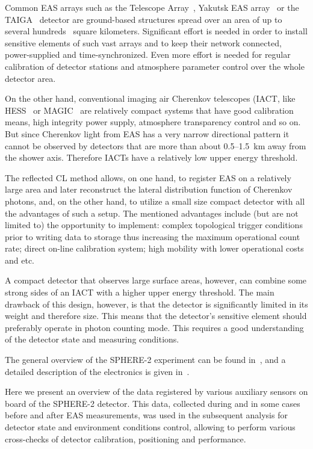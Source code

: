 \documentclass[final,5p,times,twocolumn]{elsarticle}
\begin{document}
Common EAS arrays such as the Telescope Array~\cite{abu12}, Yakutsk EAS array~\cite{Yakutsk19} or the TAIGA~\cite{TAIGA20} detector are ground-based structures spread over an area of up to several hundreds~\cite{abu12} square kilometers. Significant effort is needed in order to install sensitive elements of such vast arrays and to keep their network connected, power-supplied and time-synchronized. Even more effort is needed for regular calibration of detector stations and atmosphere parameter control over the whole detector area. 

On the other hand, conventional imaging air Cherenkov telescopes (IACT, like HESS~\cite{HESS03a, HESS03b} or MAGIC~\cite{MAGIC16-1, MAGIC16-2} are relatively compact systems that have good calibration means, high integrity power supply, atmosphere transparency control and so on. But since Cherenkov light from EAS has a very narrow directional pattern it cannot be observed by detectors that are more than about 0.5--1.5~km away from the shower axis. Therefore IACTs have a relatively low upper energy threshold.

The reflected CL method allows, on one hand, to register EAS on a relatively large area and later reconstruct the lateral distribution function of Cherenkov photons, and, on the other hand, to utilize a small size compact detector with all the advantages of such a setup. The mentioned advantages include (but are not limited to) the opportunity to implement: complex topological trigger conditions prior to writing data to storage thus increasing the maximum operational count rate; direct on-line calibration system; high mobility with lower operational costs and etc.

A compact detector that observes large surface areas, however, can combine some strong sides of an IACT with a higher upper energy threshold. The main drawback of this design, however, is that the detector is significantly limited in its weight and therefore size. This means that the detector's sensitive element should preferably operate in photon counting mode. This requires a good understanding of the detector state and measuring conditions.

The general overview of the SPHERE-2 experiment can be found in~\cite{Ant15a}, and a detailed description of the electronics is given in~\cite{Ant20}. 

Here we present an overview of the data registered by various auxiliary sensors on board of the SPHERE-2 detector. This data, collected during and in some cases before and after EAS measurements, was used in the subsequent analysis for detector state and environment conditions control, allowing to perform various cross-checks of detector calibration, positioning and performance.
\end{document}
